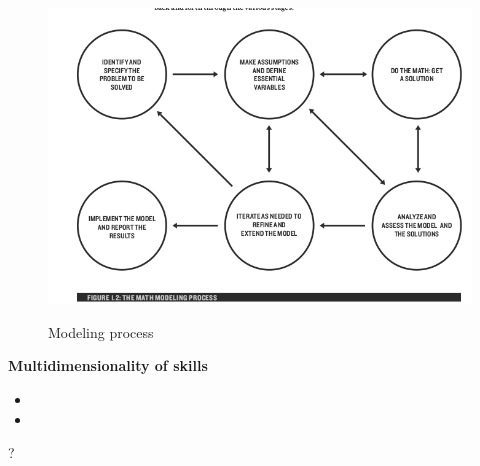 \begin{frame}
\begin{figure}[htp]\centering
	\caption{Modeling process}\scalebox{0.45}
	{\includegraphics{../../01_introduction/material/fig-modeling-process}}
\end{figure}

\end{frame}
\begin{frame}
\textbf{Multidimensionality of skills}\vspace{0.3cm}

\begin{itemize}
\item {}
\item {}
\end{itemize}


\end{frame}
\begin{frame}

\begin{center}
{\fontsize{125}{60}\selectfont ?}
\end{center}

\end{frame}
